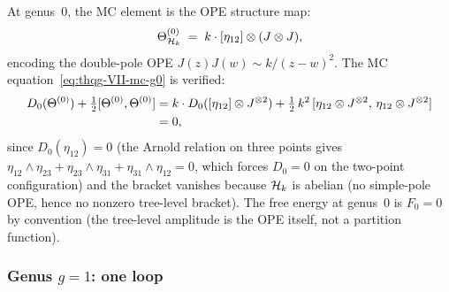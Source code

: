 \begin{computation}
\label{comp:thqg-VII-heis-g0}
At genus~$0$, the MC element is the OPE structure map:
\begin{equation}\label{eq:thqg-VII-heis-theta0}
\Theta^{(0)}_{\mathcal{H}_k}
\;=\;
k \cdot [\eta_{12}] \otimes (J \otimes J),
\end{equation}
encoding the double-pole OPE $J(z)J(w) \sim k/(z-w)^2$. The MC
equation~\eqref{eq:thqg-VII-mc-g0} is verified:
\begin{align}
D_0(\Theta^{(0)}) + \tfrac{1}{2}[\Theta^{(0)},\Theta^{(0)}]
&= k \cdot D_0([\eta_{12}] \otimes J^{\otimes 2})
 + \tfrac{1}{2}\,k^2\,[\eta_{12} \otimes J^{\otimes 2},\,
 \eta_{12} \otimes J^{\otimes 2}]\notag\\
&= 0,\label{eq:thqg-VII-heis-mc-g0-check}
\end{align}
since $D_0(\eta_{12}) = 0$ (the Arnold relation on three
points gives $\eta_{12} \wedge \eta_{23} + \eta_{23} \wedge
\eta_{31} + \eta_{31} \wedge \eta_{12} = 0$, which forces
$D_0 = 0$ on the two-point configuration) and the bracket
vanishes because $\mathcal{H}_k$ is abelian (no simple-pole OPE, hence
no nonzero tree-level bracket).
The free energy at genus~$0$ is $F_0 = 0$ by convention
(the tree-level amplitude is the OPE itself, not a partition
function).
\end{computation}

\subsubsection{Genus $g = 1$: one loop}
\label{subsubsec:thqg-VII-heis-g1}

